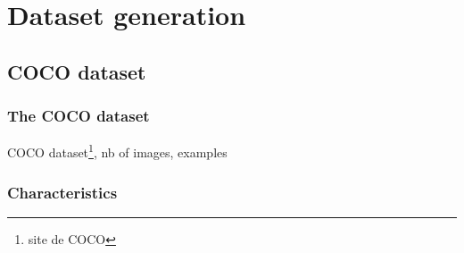 \documentclass{article}
\begin{document}
\section{Dataset generation}
    \subsection{COCO dataset}
        \subsubsection{The COCO dataset}
        COCO dataset\footnote{site de COCO}, nb of images, examples
        \subsubsection{Characteristics}
        \label{par:charac}
\end{document}
